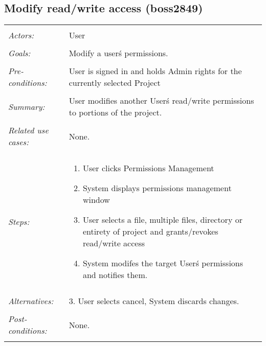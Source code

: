 \documentclass[11pt]{report}
\begin{document}
\subsection{Modify read/write access (boss2849)}
\begin{tabular}{ p{2cm} p{12cm} }
 \hline
 \\
 \textit{Actors:} & User \\ 
 \\
 \textit{Goals:} & Modify a user\'s permissions. \\
 \\
 \textit{Pre-conditions:} & User is signed in and holds Admin rights for the currently selected Project\\
 \\
 \textit{Summary:} & User modifies another User\'s read/write permissions to portions of the project. \\
 \\
 \textit{Related use cases:} & None. \\ 
 \\
 \textit{Steps:} & \begin{enumerate}
  \item User clicks Permissions Management
  \item System displays permissions management window
  \item User selects a file, multiple files, directory or entirety of project and grants/revokes read/write access
  \item System modifes the target User\'s permissions and notifies them.
 \end{enumerate} \\
 \\
 \textit{Alternatives:} & 3. User selects cancel, System discards changes. \\
 \\
 \textit{Post-conditions:} & None. \\
 \\
\hline
\end{tabular}
\end{document}

